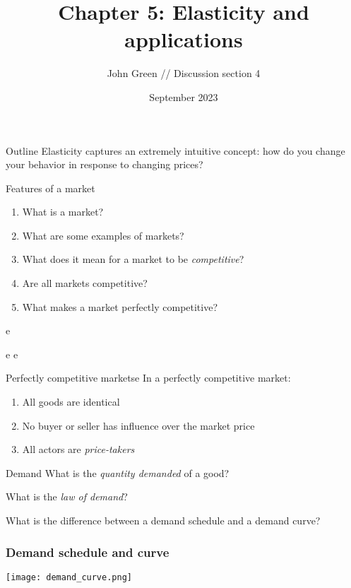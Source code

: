 \documentclass[aspectratio=169]{beamer}
\title{Chapter 5: Elasticity and applications}
\author{John Green //
    Discussion section 4}
\date{September 2023}
\begin{document}
\begin{frame}
    \titlepage 
\end{frame}

\begin{frame}{Outline}
    Elasticity captures an extremely intuitive concept: how do you change your behavior in response to changing prices?
\end{frame}

\begin{frame}{Features of a market}
    \begin{enumerate}
        \item What is a market?
        \item What are some examples of markets?
        \item What does it mean for a market to be \textit{competitive}?
        \item Are all markets competitive?
        \item What makes a market perfectly competitive?
    \end{enumerate}e
\end{frame}e
e
\begin{frame}{Perfectly competitive markets}e
    In a perfectly competitive market:
    \begin{enumerate}
        \item All goods are identical
        \item No buyer or seller has influence over the market price
        \item All actors are \textit{price-takers}
    \end{enumerate}
\end{frame}

\begin{frame}{Demand}
    What is the \textit{quantity demanded} of a good?

    \medskip

    What is the \textit{law of demand}?

    \medskip

    What is the difference between a demand schedule and a demand curve?

\end{frame} 

\begin{frame}
    \frametitle{Demand schedule and curve}
    \centering
    \texttt{[image: demand\_curve.png]}
\end{frame}
\end{document}

